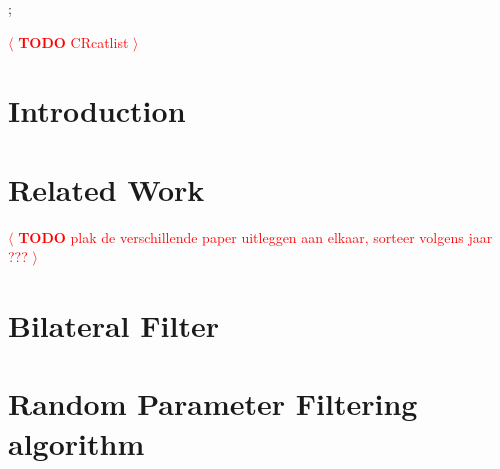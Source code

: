 \documentclass[review]{acmsiggraph}
\newcommand{\todo}[1]{\textcolor{red}{\(\langle\) \textbf{TODO} #1 \(\rangle\) }}
\begin{document}

\begin{CRcatlist}
  ;
\end{CRcatlist}
\todo{CRcatlist}


\keywordlist


\TOGlinkslist


\copyrightspace


\section{Introduction}


\section{Related Work}
\todo{plak de verschillende paper uitleggen aan elkaar, sorteer volgens jaar ???}


\section{Bilateral Filter}


\section{Random Parameter Filtering algorithm}
\end{document}
